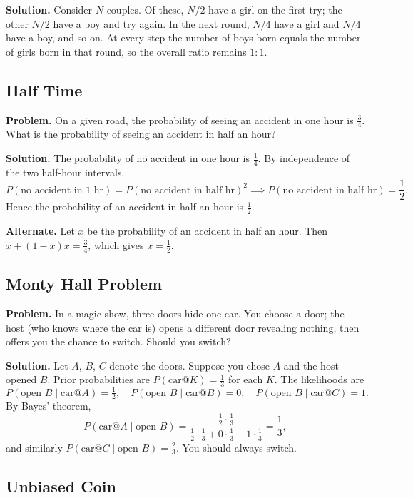 \textbf{Solution.} Consider $N$ couples. Of these, $N/2$ have a girl on the first try; the other $N/2$ have a boy and try again. In the next round, $N/4$ have a girl and $N/4$ have a boy, and so on. At every step the number of boys born equals the number of girls born in that round, so the overall ratio remains $1:1$.

\subsection{Half Time}

\textbf{Problem.} On a given road, the probability of seeing an accident in one hour is $\frac{3}{4}$. What is the probability of seeing an accident in half an hour?

\textbf{Solution.} The probability of no accident in one hour is $\frac{1}{4}$. By independence of the two half-hour intervals,
\[
  P(\text{no accident in 1 hr}) = P(\text{no accident in half hr})^2
  \implies P(\text{no accident in half hr}) = \frac{1}{2}.
\]
Hence the probability of an accident in half an hour is $\frac{1}{2}$.

\textbf{Alternate.} Let $x$ be the probability of an accident in half an hour. Then $x + (1-x)x = \frac{3}{4}$, which gives $x = \frac{1}{2}$.

\subsection{Monty Hall Problem}

\textbf{Problem.} In a magic show, three doors hide one car. You choose a door; the host (who knows where the car is) opens a different door revealing nothing, then offers you the chance to switch. Should you switch?

\textbf{Solution.} Let $A$, $B$, $C$ denote the doors. Suppose you chose $A$ and the host opened $B$. Prior probabilities are $P(\text{car} @ K) = \frac{1}{3}$ for each $K$. The likelihoods are
\[
  P(\text{open } B \mid \text{car} @ A) = \tfrac{1}{2}, \quad
  P(\text{open } B \mid \text{car} @ B) = 0, \quad
  P(\text{open } B \mid \text{car} @ C) = 1.
\]
By Bayes' theorem,
\[
  P(\text{car} @ A \mid \text{open } B) = \frac{\frac{1}{2} \cdot \frac{1}{3}}{\frac{1}{2} \cdot \frac{1}{3} + 0 \cdot \frac{1}{3} + 1 \cdot \frac{1}{3}} = \frac{1}{3},
\]
and similarly $P(\text{car} @ C \mid \text{open } B) = \frac{2}{3}$. You should always switch.

\subsection{Unbiased Coin}


